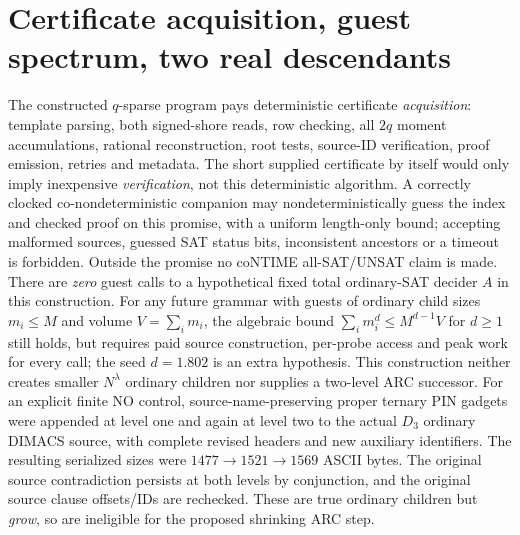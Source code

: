 \documentclass[11pt]{article}
\begin{document}
\section{Certificate acquisition, guest spectrum, two real descendants}
The constructed $q$-sparse program pays deterministic certificate \emph{acquisition}: template parsing, both signed-shore reads, row checking, all $2q$ moment accumulations, rational reconstruction, root tests, source-ID verification, proof emission, retries and metadata. The short supplied certificate by itself would only imply inexpensive \emph{verification}, not this deterministic algorithm. A correctly clocked co-nondeterministic companion may nondeterministically guess the index and checked proof on this promise, with a uniform length-only bound; accepting malformed sources, guessed SAT status bits, inconsistent ancestors or a timeout is forbidden. Outside the promise no coNTIME all-SAT/UNSAT claim is made.
There are \emph{zero} guest calls to a hypothetical fixed total ordinary-SAT decider $A$ in this construction. For any future grammar with guests of ordinary child sizes $m_i\le M$ and volume $V=\sum_i m_i$, the algebraic bound $\sum_i m_i^d\le M^{d-1}V$ for $d\ge1$ still holds, but requires paid source construction, per-probe access and peak work for every call; the seed $d=1.802$ is an extra hypothesis. This construction neither creates smaller $N^\lambda$ ordinary children nor supplies a two-level ARC successor.
For an explicit finite NO control, source-name-preserving proper ternary PIN gadgets were appended at level one and again at level two to the actual $D_3$ ordinary DIMACS source, with complete revised headers and new auxiliary identifiers. The resulting serialized sizes were $1477\to1521\to1569$ ASCII bytes. The original source contradiction persists at both levels by conjunction, and the original source clause offsets/IDs are rechecked. These are true ordinary children but \emph{grow}, so are ineligible for the proposed shrinking ARC step.
\end{document}
